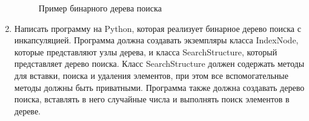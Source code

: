 \begin{enumerate}
\begin{figure}[h]
\centering
{}
\caption{Пример бинарного дерева поиска}
\end{figure}

\item Написать программу на Python, которая реализует бинарное дерево поиска с инкапсуляцией. Программа должна создавать экземпляры класса IndexNode, которые представляют узлы дерева, и класса SearchStructure, который представляет дерево поиска. Класс SearchStructure должен содержать методы для вставки, поиска и удаления элементов, при этом все вспомогательные методы должны быть приватными. Программа также должна создавать дерево поиска, вставлять в него случайные числа и выполнять поиск элементов в дереве.


\end{enumerate}
